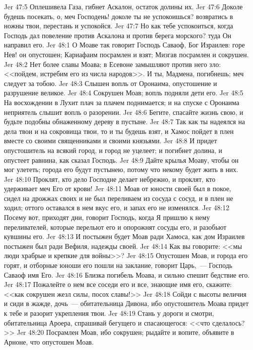 \vs Jer 47:5 Оплешивела Газа, гибнет Аскалон, остаток долины их.
\vs Jer 47:6 Доколе будешь посекать, о, меч Господень! доколе ты не успокоишься? возвратись в ножны твои, перестань и успокойся.
\vs Jer 47:7 Но как тебе успокоиться, когда Господь дал повеление против Аскалона и против берега морского? туда Он направил его.
\vs Jer 48:1 О Моаве так говорит Господь Саваоф, Бог Израилев: горе Нев! он опустошен; Кариафаим посрамлен и взят; Мизгав посрамлен и сокрушен.
\vs Jer 48:2 Нет более славы Моава; в Есевоне замышляют против него зло: <<пойдем, истребим его из числа народов>>. И ты, Мадмена, погибнешь; меч следует за тобою.
\vs Jer 48:3 Слышен вопль от Оронаима, опустошение и разрушение великое.
\vs Jer 48:4 Сокрушен Моав; вопль подняли дети его.
\vs Jer 48:5 На восхождении в Лухит плач за плачем поднимается; и на спуске с Оронаима неприятель слышит вопль о разорении.
\vs Jer 48:6 Бегите, спасайте жизнь свою, и будьте подобны обнаженному дереву в пустыне.
\vs Jer 48:7 Так как ты надеялся на дела твои и на сокровища твои, то и ты будешь взят, и Хамос пойдет в плен вместе со своими священниками и своими князьями.
\vs Jer 48:8 И придет опустошитель на всякий город, и город не уцелеет; и погибнет долина, и опустеет равнина, как сказал Господь.
\vs Jer 48:9 Дайте крылья Моаву, чтобы он мог улететь; города его будут пустынею, потому что некому будет жить в них.
\vs Jer 48:10 Проклят, кто дело Господне делает небрежно, и проклят, кто удерживает меч Его от крови!
\vs Jer 48:11 Моав от юности своей был в покое, сидел на дрожжах своих и не был переливаем из сосуда с сосуд, и в плен не ходил; оттого оставался в нем вкус его, и запах его не изменялся.
\vs Jer 48:12 Посему вот, приходят дни, говорит Господь, когда Я пришлю к нему переливателей, которые перельют его и опорожнят сосуды его, и разобьют кувшины его.
\vs Jer 48:13 И постыжен будет Моав ради Хамоса, как дом Израилев постыжен был ради Вефиля, надежды своей.
\vs Jer 48:14 Как вы говорите: <<мы люди храбрые и крепкие для войны>>?
\vs Jer 48:15 Опустошен Моав, и города его горят, и отборные юноши его пошли на заклание, говорит Царь,~--- Господь Саваоф имя Его.
\vs Jer 48:16 Близка погибель Моава, и сильно спешит бедствие его.
\vs Jer 48:17 Пожалейте о нем все соседи его и все, знающие имя его, скажите: <<как сокрушен жезл силы, посох славы!>>
\vs Jer 48:18 Сойди с высоты величия и сиди в жажде, дочь~--- обитательница Дивона, ибо опустошитель Моава придет к тебе и разорит укрепления твои.
\vs Jer 48:19 Стань у дороги и смотри, обитательница Ароера, спрашивай бегущего и спасающегося: <<что сделалось?>>
\vs Jer 48:20 Посрамлен Моав, ибо сокрушен; рыдайте и вопите, объявите в Арноне, что опустошен Моав.
